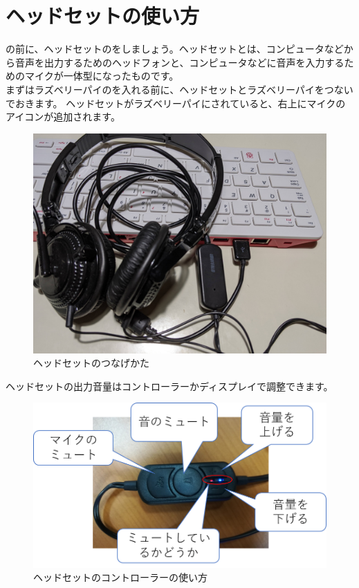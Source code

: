\newpage
\section{ヘッドセットの使い方}
の前に、ヘッドセットのをしましょう。ヘッドセットとは、コンピュータなどから音声を出力するためのヘッドフォンと、コンピュータなどに音声を入力するためのマイクが一体型になったものです。\\
まずはラズベリーパイのを入れる前に、ヘッドセットとラズベリーパイをつないでおきます。
ヘッドセットがラズベリーパイにされていると、右上にマイクのアイコンが追加されます。

\begin{figure}[H]
\begin{center}
    \includegraphics[width=.6\linewidth]{images/how_to_connect_headset.jpg}
    \caption{ヘッドセットのつなげかた}
    \label{つなげかた}
\end{center}
\end{figure}

ヘッドセットの出力音量はコントローラーかディスプレイで調整できます。

\begin{figure}[H]
\begin{center}
    \includegraphics[width=.6\linewidth]{images/chap06/text06-img004.png}
    \caption{ヘッドセットのコントローラーの使い方}
    \label{ヘッドセットのコントローラーの使い方}
\end{center}
\end{figure}

